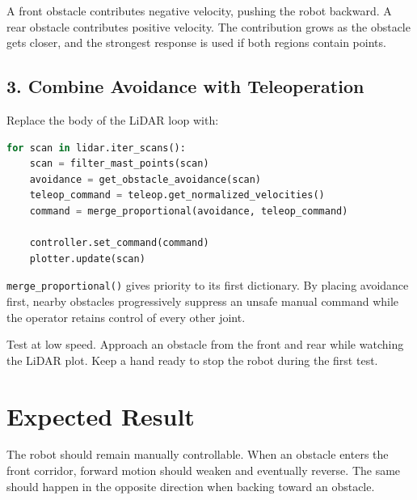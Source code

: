 \documentclass[11pt,a4paper]{article}
\begin{document}
A front obstacle contributes negative velocity, pushing the robot backward.
A rear obstacle contributes positive velocity. The contribution grows as the
obstacle gets closer, and the strongest response is used if both regions
contain points.

\subsection*{3. Combine Avoidance with Teleoperation}

Replace the body of the LiDAR loop with:

\begin{lstlisting}[language=Python]
for scan in lidar.iter_scans():
    scan = filter_mast_points(scan)
    avoidance = get_obstacle_avoidance(scan)
    teleop_command = teleop.get_normalized_velocities()
    command = merge_proportional(avoidance, teleop_command)

    controller.set_command(command)
    plotter.update(scan)
\end{lstlisting}

\texttt{merge\_proportional()} gives priority to its first dictionary. By
placing avoidance first, nearby obstacles progressively suppress an unsafe
manual command while the operator retains control of every other joint.

\begin{notebox}
Test at low speed. Approach an obstacle from the front and rear while watching
the LiDAR plot. Keep a hand ready to stop the robot during the first test.
\end{notebox}

\section*{Expected Result}

The robot should remain manually controllable. When an obstacle enters the
front corridor, forward motion should weaken and eventually reverse. The same
should happen in the opposite direction when backing toward an obstacle.
\end{document}

